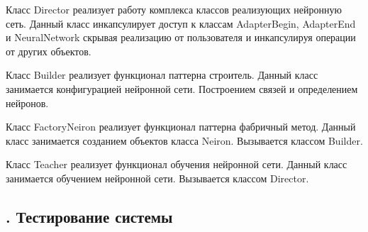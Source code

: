 {\par \redline  Класс Director реализует работу комплекса классов реализующих нейронную сеть. Данный класс инкапсулирует доступ к классам AdapterBegin, AdapterEnd и NeuralNetwork скрывая реализацию от пользователя и инкапсулируя операции от других объектов. 

\par \redline  Класс Builder реализует функционал паттерна строитель. Данный класс занимается конфигурацией нейронной сети. Построением связей и определением нейронов.

\par \redline  Класс FactoryNeiron реализует функционал паттерна фабричный метод. Данный класс занимается созданием объектов класса Neiron. Вызывается классом Builder.

\par \redline  Класс Teacher реализует функционал обучения нейронной сети. Данный класс занимается обучением нейронной сети. Вызывается классом Director.

\par


}


\subtitlespace

\subsection*{
	\gostTitleFont
	\redline
	\thechaptercntr .\thesubchaptercntr \spc
	Тестирование системы 
} \addtocounter{subchaptercntr}{1}

\subtitlespace

